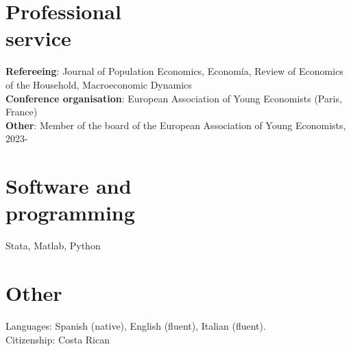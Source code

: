 \documentclass[margin]{res} %
\begin{document}
\begin{resume}

%

\section{Professional \\ service}
\textbf{Refereeing}: Journal of Population Economics, Econom\'ia, Review of Economics of the Household, Macroeconomic Dynamics \\
\textbf{Conference organisation}: European Association of Young Economists (Paris, France)
\\
\textbf{Other}: Member of the board of the European Association of Young Economists, 2023-


\section{Software and \\ programming}
Stata, Matlab, Python \\

\section{Other}
Languages: Spanish (native), English (fluent), Italian (fluent). \\
Citizenship: Costa Rican



\end{resume}
\end{document}
